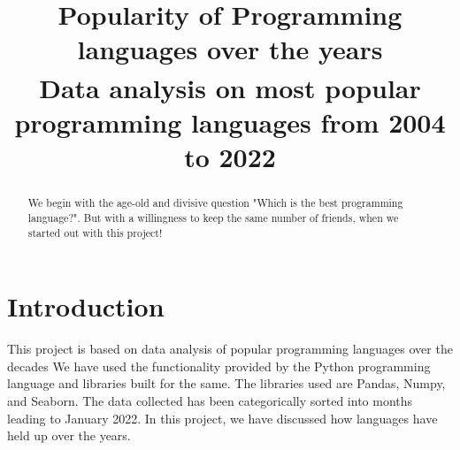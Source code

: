 \documentclass[conference]{IEEEtran}
\begin{document}
\title{Popularity of Programming languages over the years\\
{\footnotesize \textsuperscript{}Data analysis on most popular programming languages from 2004 to 2022}}


\author{
\and
{}
\and
{}
\and
{}
\and
{}
}

\maketitle

\begin{abstract}
We begin with the age-old and divisive question "Which is the best programming language?". But with a willingness to keep the same number of friends, when we started out with this project!
\end{abstract}

\section{Introduction}
This project is based on data analysis of popular programming languages over the decades
We have used the functionality provided by the Python programming language and libraries built for the same. The libraries used are Pandas, Numpy, and Seaborn. The data collected has been categorically sorted into months leading to January 2022. In this project, we have discussed how languages have held up over the years.
\end{document}
